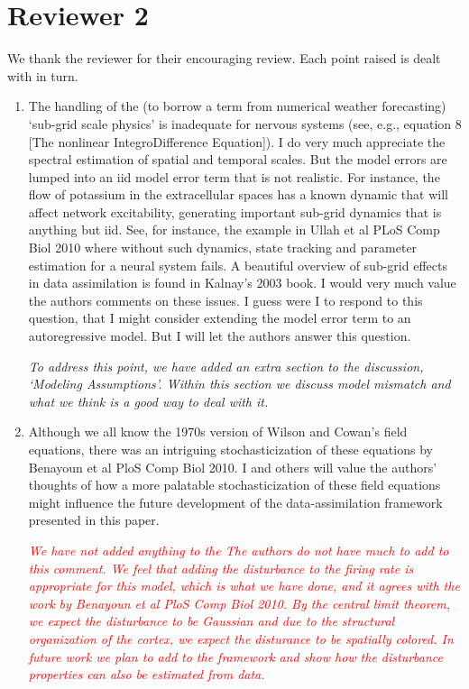 \documentclass{article}
\newcommand{\dean}[1]{\textcolor{red}{#1}}
\begin{document}
    \section{Reviewer 2}
    
    We thank the reviewer for their encouraging review. Each point raised is dealt with in turn.

\begin{enumerate}
    \item The handling of the (to borrow a term from numerical weather forecasting) `sub-grid scale physics' is inadequate for nervous systems (see, e.g., equation 8 [The nonlinear IntegroDifference Equation]). I do very much appreciate the spectral estimation of spatial and temporal scales. But the model errors are lumped into an iid model error term that is not realistic. For instance, the flow of potassium in the extracellular spaces has a known dynamic that will affect network excitability, generating important sub-grid dynamics that is anything but iid. See, for instance, the example in Ullah et al PLoS Comp Biol 2010 where without such dynamics, state tracking and parameter estimation for a neural system fails. A beautiful overview of sub-grid effects in data assimilation is found in Kalnay's 2003 book. I would very much value the authors comments on these issues. I guess were I to respond to this question, that I might consider extending the model error term to an autoregressive model. But I will let the authors answer this question.

	\emph{To address this point, we have added an extra section to the discussion, `Modeling Assumptions'. Within this section we discuss model mismatch and what we think is a good way to deal with it.}
	

\item Although we all know the 1970s version of Wilson and Cowan's field equations, there was an intriguing stochasticization of these equations by Benayoun et al PloS Comp Biol 2010. I and others will value the authors' thoughts of how a more palatable stochasticization of these field equations might influence the future development of the data-assimilation framework presented in this paper.

\dean{\emph{We have not added anything to the The authors do not have much to add to this comment. We feel that adding the disturbance to the firing rate is appropriate for this model, which is what we have done, and it agrees with the work by Benayoun et al PloS Comp Biol 2010. By the central limit theorem, we expect the disturbance to be Gaussian and due to the structural organization of the cortex, we expect the disturance to be spatially colored. In future work we plan to add to the framework and show how the disturbance properties can also be estimated from data.}}


\end{enumerate}
\end{document}
